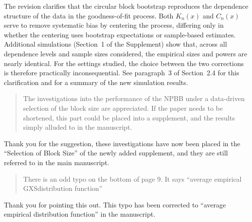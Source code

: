 \documentclass[12pt]{article}
\newenvironment{comment}%
{\begin{quotation}\noindent\small\it\color{darkblue}\ignorespaces%
}{\end{quotation}}
\begin{document}
The revision clarifies that the circular block bootstrap reproduces
the dependence structure of the data in the goodness-of-fit process.
Both $K_n(x)$ and $C_n(x)$ serve to remove systematic bias by
centering the process, differing only in whether the centering uses
bootstrap expectations or sample-based estimates.
Additional simulations (Section~1 of the Supplement) show
that, across all dependence levels and sample sizes considered, the
empirical sizes and powers are nearly identical. For the settings
studied, the choice between the two corrections is therefore
practically inconsequential. See paragraph~3 of Section~2.4 for this
clarification and for a summary of the new simulation results.


\begin{comment}
The investigations into the performance of the NPBB under a
data-driven selection of the block size are appreciated.  If the paper
needs to be shortened, this part could be placed into a supplement,
and the results simply alluded to in the manuscript.
\end{comment}

Thank you for the suggestion, these investigations have now been
placed in the ``Selection of Block Size'' of the newly added
supplement, and they are still referred to in the main manuscript.

\begin{comment}
There is an odd typo on the bottom of page 9. It says ``average
empirical GXSdistribution function''
\end{comment}

Thank you for pointing this out. This typo has been
corrected to ``average empirical distribution function'' in the manuscript.





\end{document}
